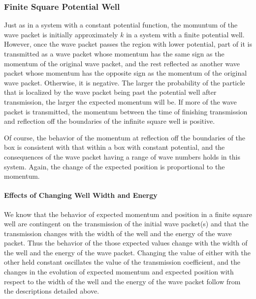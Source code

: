 \subsubsection*{Finite Square Potential Well}

Just as in a system with a constant potential function, the momuntum of the
wave packet is initially approximately $k$ in a system with a finite
potential well. However, once the wave packet passes the region with lower
potential, part of it is transmitted as a wave packet whose momentum has the
same sign as the momentum of the original wave packet, and the rest
reflected as another wave packet whose momentum has the opposite sign as the
momentum of the original wave packet. Otherwise, it is negative. The larger
the probability of the particle that is localized by the wave packet being
past the potential well after transmission, the larger the expected momentum
will be. If more of the wave packet is transmitted, the momentum between the
time of finishing transmission and reflection off the boundaries of the
infinite square well is positive.

Of course, the behavior of the momentum at reflection off the boundaries of
the box is consistent with that within a box with constant potential, and
the consequences of the wave packet having a range of wave numbers holds in
this system. Again, the change of the expected position is proportional to
the momentum.

\paragraph{Effects of Changing Well Width and Energy}  We know that the
behavior of expected momentum and position in a finite square well are
contingent on the transmission of the initial wave packet(s) and that the
transmission changes with the width of the well and the energy of the wave
packet. Thus the behavior of the those expected values change with the width
of the well and the energy of the wave packet. Changing the value of either
with the other held constant oscillates the value of the transmission
coefficient, and the changes in the evolution of expected momentum and
expected position with respect to the width of the well and the energy of
the wave packet follow from the descriptions detailed above.
